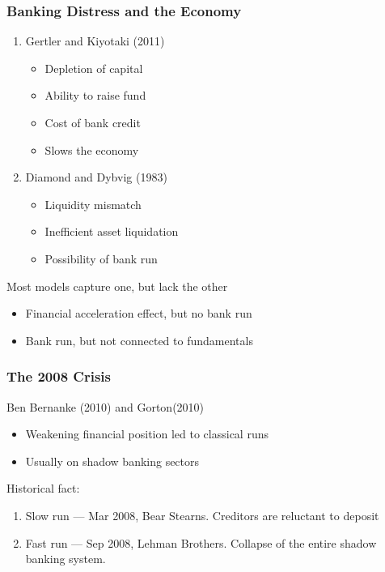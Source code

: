 \begin{frame}
    \frametitle{Banking Distress and the Economy}

    \begin{enumerate}
        \item Gertler and Kiyotaki (2011)
        \begin{itemize}
            \item Depletion of capital
            \item Ability to raise fund
            \item Cost of bank credit
            \item Slows the economy
        \end{itemize}
        \item Diamond and Dybvig (1983)
        \begin{itemize}
            \item Liquidity mismatch
            \item Inefficient asset liquidation 
            \item Possibility of bank run
        \end{itemize}
    \end{enumerate}

    Most models capture one, but lack the other
    \begin{itemize}
        \item Financial acceleration effect, but no bank run 
        \item Bank run, but not connected to fundamentals
    \end{itemize}

\end{frame}

\begin{frame}
    \frametitle{The 2008 Crisis}
    Ben Bernanke (2010) and Gorton(2010) 
    \begin{itemize}
        \item Weakening financial position led to classical runs 
        \item Usually on shadow banking sectors
    \end{itemize}

    Historical fact: 
    \begin{enumerate}
        \item Slow run --- Mar 2008, Bear Stearns. Creditors are reluctant to deposit
        \item Fast run --- Sep 2008, Lehman Brothers. Collapse of the entire shadow banking system.
    \end{enumerate}

\end{frame}

